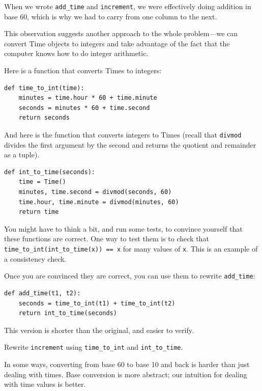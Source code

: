 \documentclass[10pt]{book}
\begin{document}

When we wrote \verb"add_time" and {\tt increment}, we were effectively
doing addition in base 60, which is why we had to carry from one
column to the next.


This observation suggests another approach to the whole problem---we
can convert Time objects to integers and take advantage of the fact
that the computer knows how to do integer arithmetic.  

Here is a function that converts Times to integers:

\beforeverb
\begin{verbatim}
def time_to_int(time):
    minutes = time.hour * 60 + time.minute
    seconds = minutes * 60 + time.second
    return seconds
\end{verbatim}
\afterverb
%
And here is the function that converts integers to Times
(recall that {\tt divmod} divides the first argument by the second
and returns the quotient and remainder as a tuple).


\beforeverb
\begin{verbatim}
def int_to_time(seconds):
    time = Time()
    minutes, time.second = divmod(seconds, 60)
    time.hour, time.minute = divmod(minutes, 60)
    return time
\end{verbatim}
\afterverb
%
You might have to think a bit, and run some tests, to convince
yourself that these functions are correct.  One way to test them is to
check that \verb"time_to_int(int_to_time(x)) == x" for many values of
{\tt x}.  This is an example of a consistency check.


Once you are convinced they are correct, you can use them to 
rewrite \verb"add_time":

\beforeverb
\begin{verbatim}
def add_time(t1, t2):
    seconds = time_to_int(t1) + time_to_int(t2)
    return int_to_time(seconds)
\end{verbatim}
\afterverb
%
This version is shorter than the original, and easier to verify.

\begin{ex}
Rewrite {\tt increment} using \verb"time_to_int" and \verb"int_to_time".
\end{ex}

In some ways, converting from base 60 to base 10 and back is harder
than just dealing with times.  Base conversion is more abstract; our
intuition for dealing with time values is better.
\end{document}
